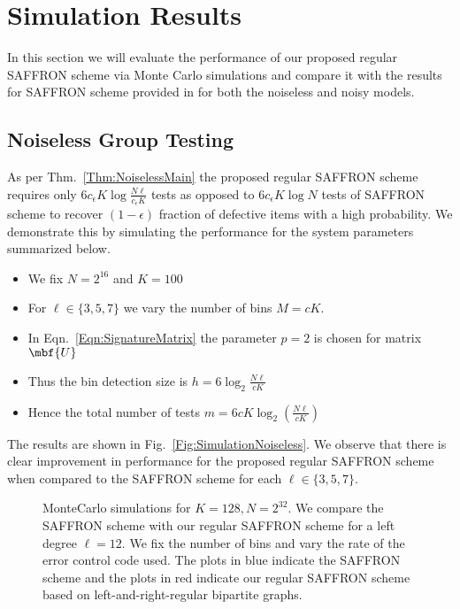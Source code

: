 \documentclass[conference,,twocolumn]{IEEEtran}
\newcommand*{\FigPath}{./Figures}
\def\ceps{c_{\epsilon}}
\begin{document}
\section{Simulation Results}
In this section we will evaluate the performance of our proposed regular SAFFRON scheme via Monte Carlo simulations and compare it with the results for SAFFRON scheme provided in \cite{lee2015saffron} for both the noiseless and noisy models.

\subsection*{Noiseless Group Testing}
As per Thm.~\ref{Thm:NoiselessMain} the proposed regular SAFFRON scheme requires only $6\ceps K\log \frac{N\ell}{\ceps K}$ tests as opposed to $6\ceps K\log N$ tests of SAFFRON scheme to recover $(1-\epsilon)$ fraction of defective items with a high probability. We demonstrate this by simulating the performance for the system parameters summarized below.
\begin{itemize}
\item We fix $N=2^{16}$ and $K=100$
\item For $\ell\in\{3,5,7\}$ we vary the number of bins $M=c K$. 
\item In Eqn.~\ref{Eqn:SignatureMatrix} the parameter $p=2$ is chosen for matrix $\mbf{U}$
\item Thus the bin detection size is $h=6\log_2 \frac{N\ell}{cK}$
\item Hence the total number of tests $m=6cK\log_2 \left(\frac{N\ell}{cK}\right)$
\end{itemize} 
The results are shown in Fig.~\ref{Fig:SimulationNoiseless}. We observe that there is clear improvement in performance for the proposed regular SAFFRON scheme when compared to the SAFFRON scheme for each $\ell\in\{3,5,7\}$.

\begin{figure}[t!]
\centering

\caption{MonteCarlo simulations for $K=128, N=2^{32}$. We compare the SAFFRON scheme with our regular SAFFRON scheme for a left degree $\ell=12$. We fix the number of bins and vary the rate of the error control code used. The plots in blue indicate the SAFFRON scheme\cite{lee2015saffron} and the plots in red indicate our regular SAFFRON scheme based on left-and-right-regular bipartite graphs.}
\label{Fig:SimulationNoisy}
\end{figure}
\end{document}
